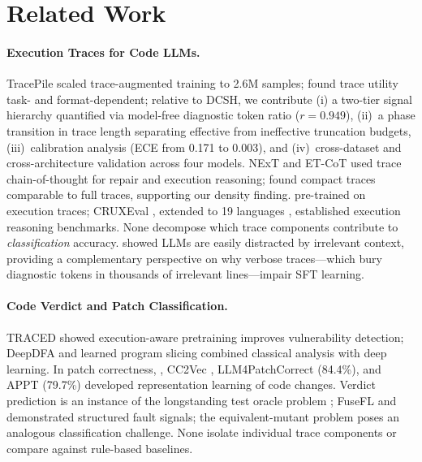 \section{Related Work}

\paragraph{Execution Traces for Code LLMs.}
TracePile \citep{chen2025tracepile} scaled trace-augmented training to 2.6M samples; \citet{wang2025dcsh} found trace utility task- and format-dependent; relative to DCSH, we contribute (i) a two-tier signal hierarchy quantified via model-free diagnostic token ratio ($r{=}0.949$), (ii)~a phase transition in trace length separating effective from ineffective truncation budgets, (iii)~calibration analysis (ECE from 0.171 to 0.003), and (iv)~cross-dataset and cross-architecture validation across four models.
NExT \citep{ni2024next} and ET-CoT \citep{eguchi2025etcot} used trace chain-of-thought for repair and execution reasoning; \citet{ferrando2025execute} found compact traces comparable to full traces, supporting our density finding.
\citet{liu2023codeexecution} pre-trained on execution traces; CRUXEval \citep{gu2024cruxeval}, extended to 19 languages \citep{xu2025cruxevalx}, established execution reasoning benchmarks.
None decompose which trace components contribute to \emph{classification} accuracy.
\citet{shi2023distracted} showed LLMs are easily distracted by irrelevant context, providing a complementary perspective on why verbose traces---which bury diagnostic tokens in thousands of irrelevant lines---impair SFT learning.

\paragraph{Code Verdict and Patch Classification.}
TRACED \citep{ding2024traced} showed execution-aware pretraining improves vulnerability detection; DeepDFA \citep{steenhoek2024deepdfa} and learned program slicing \citep{yadavally2024slicing} combined classical analysis with deep learning.
In patch correctness, \citet{tian2020patchcorrectness}, CC2Vec \citep{hoang2020cc2vec}, LLM4PatchCorrect \citep{zhou2024llm4patch} (84.4\%), and APPT \citep{appt2024} (79.7\%) developed representation learning of code changes.
Verdict prediction is an instance of the longstanding test oracle problem \citep{barr2015oracle}; FuseFL \citep{widyasari2024fusefl} and \citet{foster2025mutation} demonstrated structured fault signals; the equivalent-mutant problem \citep{papadakis2019mutation} poses an analogous classification challenge.
None isolate individual trace components or compare against rule-based baselines.

